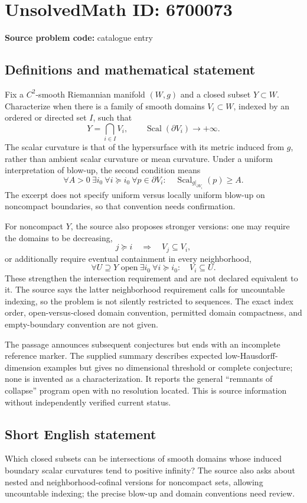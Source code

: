 \documentclass[11pt]{article}
\begin{document}
\section*{UnsolvedMath ID: 6700073}
\textbf{Source problem code:} catalogue entry
\subsection{Definitions and mathematical statement}
Fix a \(C^2\)-smooth Riemannian manifold \((W,g)\) and a closed subset \(Y\subset W\). Characterize when there is a family of smooth domains \(V_i\subset W\), indexed by an ordered or directed set \(I\), such that
\[
 Y=\bigcap_{i\in I}V_i,
 \qquad \operatorname{Scal}(\partial V_i)\longrightarrow+\infty.
\]
The scalar curvature is that of the hypersurface with its metric induced from \(g\), rather than ambient scalar curvature or mean curvature. Under a uniform interpretation of blow-up, the second condition means
\[
 \forall A>0\ \exists i_0\ \forall i\succeq i_0\ \forall p\in\partial V_i:
 \quad\operatorname{Scal}_{g|_{\partial V_i}}(p)\ge A.
\]
The excerpt does not specify uniform versus locally uniform blow-up on noncompact boundaries, so that convention needs confirmation.

For noncompact \(Y\), the source also proposes stronger versions: one may require the domains to be decreasing,
\[
 j\succeq i\quad\Longrightarrow\quad V_j\subseteq V_i,
\]
or additionally require eventual containment in every neighborhood,
\[
 \forall U\supseteq Y\text{ open}\ \exists i_0\ \forall i\succeq i_0:
 \quad V_i\subseteq U.
\]
These strengthen the intersection requirement and are not declared equivalent to it. The source says the latter neighborhood requirement calls for uncountable indexing, so the problem is not silently restricted to sequences. The exact index order, open-versus-closed domain convention, permitted domain compactness, and empty-boundary convention are not given.

The passage announces subsequent conjectures but ends with an incomplete reference marker. The supplied summary describes expected low-Hausdorff-dimension examples but gives no dimensional threshold or complete conjecture; none is invented as a characterization. It reports the general ``remnants of collapse'' program open with no resolution located. This is source information without independently verified current status.
\subsection{Short English statement}
Which closed subsets can be intersections of smooth domains whose induced boundary scalar curvatures tend to positive infinity? The source also asks about nested and neighborhood-cofinal versions for noncompact sets, allowing uncountable indexing; the precise blow-up and domain conventions need review.
\end{document}
